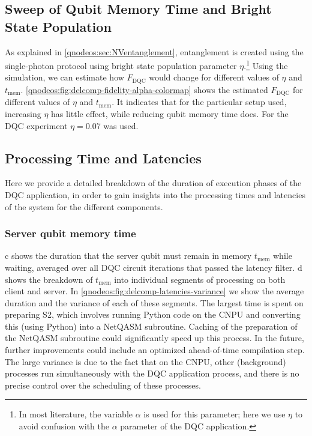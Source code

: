 \subsection{Sweep of Qubit Memory Time and Bright State Population}

As explained in \cref{qnodeos:sec:NVentanglement}, entanglement is created using the single-photon protocol using bright state population parameter $\eta$.\footnote{In most literature, the variable $\alpha$ is used for this parameter; here we use $\eta$ to avoid confusion with the $\alpha$ parameter of the \ac{DQC} application.} Using the simulation, we can estimate how $F_{\text{DQC}}$ would change for different values of $\eta$ and $t_{\text{mem}}$. \cref{qnodeos:fig:delcomp-fidelity-alpha-colormap} shows the estimated $F_{\text{DQC}}$ for different values of $\eta$ and $t_{\text{mem}}$. It indicates that for the particular setup used, increasing $\eta$ has little effect, while reducing qubit memory time does. For the \ac{DQC} experiment $\eta = 0.07$ was used.

\subsection{Processing Time and Latencies}
\label{qnodeos:sec:processing_time_latencies}

Here we provide a detailed breakdown of the duration of execution phases of the \ac{DQC} application, in order to gain insights into the processing times and latencies of the system for the different components.

\subsubsection{Server qubit memory time}
\label{qnodeos:sec:server-qubit-memory-time}

c shows the duration that the server qubit must remain in memory $t_{\text{mem}}$ while waiting, averaged over all \ac{DQC} circuit iterations that passed the latency filter. d shows the breakdown of $t_{\text{mem}}$ into individual segments of processing on both client and server. In \cref{qnodeos:fig:delcomp-latencies-variance} we show the average duration and the variance of each of these segments. The largest time is spent on preparing S2, which involves running Python code on the \ac{CNPU} and converting this (using Python) into a \ac{NetQASM} subroutine. Caching of the preparation of the \ac{NetQASM} subroutine could significantly speed up this process. In the future, further improvements could include an optimized ahead-of-time compilation step. The large variance is due to the fact that on the \ac{CNPU}, other (background) processes run simultaneously with the \ac{DQC} application process, and there is no precise control over the scheduling of these processes.


